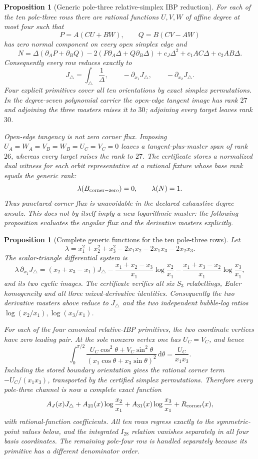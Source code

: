\documentclass[11pt]{article}
\newtheorem{proposition}[theorem]{Proposition}
\theoremstyle{definition}
\theoremstyle{remark}
\newcommand{\dd}{\mathrm d}
\begin{document}
\begin{proposition}[Generic pole-three relative-simplex IBP reduction]
For each of the ten pole-three rows there are rational functions
$U,V,W$ of affine degree at most four such that
\[
 P=A(CU+BW),\qquad Q=B(CV-AW)
\]
has zero normal component on every open simplex edge and
\[
 N=\Delta(\partial_AP+\partial_BQ)
 -2(P\partial_A\Delta+Q\partial_B\Delta)
 +c_J\Delta^2+c_1AC\Delta+c_2AB\Delta.
\]
Consequently every row reduces exactly to
\[
 J_\triangle=\int_\triangle\frac1\Delta,
 \qquad -\partial_{x_1}J_\triangle,
 \qquad -\partial_{x_2}J_\triangle.
\]
Four explicit primitives cover all ten orientations by exact simplex
permutations.  In the degree-seven polynomial carrier the open-edge tangent
image has rank $27$ and adjoining the three masters raises it to $30$;
adjoining every target leaves rank $30$.

Open-edge tangency is not zero corner flux.  Imposing
$U_A=W_A=V_B=W_B=U_C=V_C=0$ leaves a tangent-plus-master span of rank $26$,
whereas every target raises the rank to $27$.  The certificate stores a
normalized dual witness for each orbit representative at a rational fixture
whose base rank equals the generic rank:
\[
 \lambda(B_{\rm corner-zero})=0,\qquad \lambda(N)=1.
\]
Thus punctured-corner flux is unavoidable in the declared exhaustive degree
ansatz.  This does not by itself imply a new logarithmic master: the following
proposition evaluates the angular flux and the derivative masters explicitly.
\end{proposition}

\begin{proposition}[Complete generic functions for the ten pole-three rows]
Let
\[
 \lambda=x_1^2+x_2^2+x_3^2
 -2x_1x_2-2x_1x_3-2x_2x_3.
\]
The scalar-triangle differential system is
\[
 \lambda\,\partial_{x_1}J_\triangle
 =(x_2+x_3-x_1)J_\triangle
 -\frac{x_1+x_2-x_3}{x_1}\log\frac{x_2}{x_1}
 -\frac{x_1+x_3-x_2}{x_1}\log\frac{x_3}{x_1},
\]
and its two cyclic images.  The certificate verifies all six $S_3$
relabellings, Euler homogeneity and all three mixed-derivative identities.
Consequently the two derivative masters above reduce to $J_\triangle$ and
the two independent bubble-log ratios
$\log(x_2/x_1),\log(x_3/x_1)$.

For each of the four canonical relative-IBP primitives, the two coordinate
vertices have zero leading pair.  At the sole nonzero vertex one has
$U_C=V_C$, and hence
\[
 \int_0^{\pi/2}\frac{U_C\cos^2\theta+V_C\sin^2\theta}
 {(x_1\cos\theta+x_3\sin\theta)^2}\,\dd\theta
 =\frac{U_C}{x_1x_3}.
\]
Including the stored boundary orientation gives the rational corner term
$-U_C/(x_1x_3)$, transported by the certified simplex permutations.
Therefore every pole-three channel is now a complete exact function
\[
 A_J(x)J_\triangle+A_{21}(x)\log\frac{x_2}{x_1}
 +A_{31}(x)\log\frac{x_3}{x_1}+R_{\rm corner}(x),
\]
with rational-function coefficients.  All ten rows regress exactly to the
symmetric-point values below, and the integrated $I_{28}$ relation vanishes
separately in all four basis coordinates.  The remaining pole-four row is
handled separately because its primitive has a different denominator order.
\end{proposition}
\end{document}
